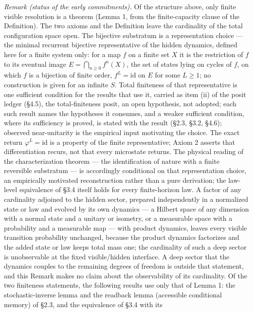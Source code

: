 \documentclass[
]{article}
\begin{document}
\emph{Remark (status of the early commitments).} Of the structure above,
only finite visible resolution is a theorem (Lemma 1, from the
finite-capacity clause of the Definition). The two axioms and the
Definition leave the cardinality of the total configuration space open.
The bijective substratum is a representation choice --- the minimal
recurrent bijective representative of the hidden dynamics, defined here
for a finite system only: for a map \(f\) on a finite set \(X\) it is
the restriction of \(f\) to its eventual image
\(E = \bigcap_{n \ge 0} f^n(X)\), the set of states lying on cycles of
\(f\), on which \(f\) is a bijection of finite order,
\(f^L = \text{id}\) on \(E\) for some \(L \ge 1\); no construction is
given for an infinite \(S\). Total finiteness of that representative is
one sufficient condition for the results that use it, carried as item
(ii) of the posit ledger (§4.5), the total-finiteness posit, an open
hypothesis, not adopted; each such result names the hypotheses it
consumes, and a weaker sufficient condition, where its sufficiency is
proved, is stated with the result (§2.3, §3.2, §4.6); observed
near-unitarity is the empirical input motivating the choice. The exact
return \(\varphi^L = \text{id}\) is a property of the finite
representative; Axiom 2 asserts that differentiation recurs, not that
every microstate returns. The physical reading of the characterization
theorem --- the identification of nature with a finite reversible
substratum --- is accordingly conditional on that representation choice,
an empirically motivated reconstruction rather than a pure derivation;
the law-level equivalence of §3.4 itself holds for every finite-horizon
law. A factor of any cardinality adjoined to the hidden sector, prepared
independently in a normalized state or law and evolved by its own
dynamics --- a Hilbert space of any dimension with a normal state and a
unitary or isometry, or a measurable space with a probability and a
measurable map --- with product dynamics, leaves every visible
transition probability unchanged, because the product dynamics
factorizes and the added state or law keeps total mass one; the
cardinality of such a deep sector is unobservable at the fixed
visible/hidden interface. A deep sector that the dynamics couples to the
remaining degrees of freedom is outside that statement, and this Remark
makes no claim about the observability of its cardinality. Of the two
finiteness statements, the following results use only that of Lemma 1:
the stochastic-inverse lemma and the readback lemma (accessible
conditional memory) of §2.3, and the equivalence of §3.4 with its
\end{document}
